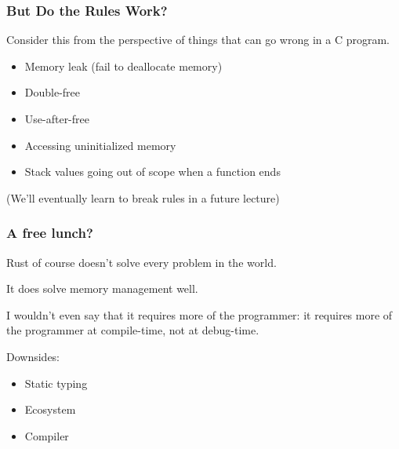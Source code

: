 \begin{frame}
\frametitle{But Do the Rules Work?}

Consider this from the perspective of things that can go wrong in a C program.

\begin{itemize}
	\item Memory leak (fail to deallocate memory)
	\item Double-free
	\item Use-after-free
	\item Accessing uninitialized memory
	\item Stack values going out of scope when a function ends
\end{itemize}

(We'll eventually learn to break rules in a future lecture)

\end{frame}


\begin{frame}
\frametitle{A free lunch?}

 Rust of course doesn't solve every problem in the world. 
 
It does solve memory management well. 

I wouldn't even say that it requires more of the programmer: it requires more of the programmer at compile-time, not at debug-time.

Downsides: 

\begin{itemize}
	\item Static typing
	\item Ecosystem
	\item Compiler
\end{itemize}


\end{frame}





